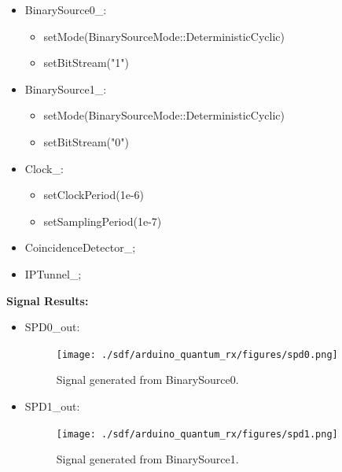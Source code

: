 \begin{refsection}
	\begin{itemize}
		\item BinarySource0\_:
		\begin{itemize}
			\item setMode(BinarySourceMode::DeterministicCyclic)
			\item setBitStream("1")
		\end{itemize}
	
		\item BinarySource1\_:
		\begin{itemize}
			\item setMode(BinarySourceMode::DeterministicCyclic)
			\item setBitStream("0")
		\end{itemize}
		
		\item Clock\_:
		\begin{itemize}
			\item setClockPeriod(1e-6)
			\item setSamplingPeriod(1e-7)
		\end{itemize}
		
		\item CoincidenceDetector\_;
		
		\item IPTunnel\_;
		

			
		\end{itemize}


\vspace{15px}


\textbf{Signal Results:}

\begin{itemize}
	
	\item SPD0\_out:
	\begin{figure}[H]
		\centering
		\texttt{[image: ./sdf/arduino\_quantum\_rx/figures/spd0.png]}
		\caption{Signal generated from BinarySource0.}
		\label{fig:arduino}
	\end{figure}

	\vspace{50px}
	\item SPD1\_out:
	\begin{figure}[H]
		\centering
		\texttt{[image: ./sdf/arduino\_quantum\_rx/figures/spd1.png]}
		\caption{Signal generated from BinarySource1.}
		\label{fig:arduino}
	\end{figure}


\end{itemize}
\end{refsection}
